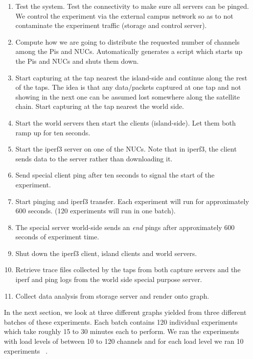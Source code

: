 \begin{enumerate}

\item Test the system. Test the connectivity to make sure all servers can be pinged. We control the experiment via the external campus network so as to not contaminate the experiment traffic (storage and control server). 
\item Compute how we are going to distribute the requested number of channels among the Pis and NUCs. Automatically generates a script which starts up the Pis and NUCs and shuts them down.
\item Start capturing at the tap nearest the island-side and continue along the rest of the taps. The idea is that any data/packets captured at one tap and not showing in the next one can be assumed lost somewhere along the satellite chain. Start capturing at the tap nearest the world side. 
\item Start the world servers then start the clients (island-side). Let them both ramp up for ten seconds.
\item Start the iperf3 server on one of the NUCs. Note that in iperf3, the client sends data to the server rather than downloading it.
\item Send special client ping after ten seconds to signal the start of the experiment.
\item Start pinging and iperf3 transfer. Each experiment will run for approximately 600 seconds. (120 experiments will run in one batch).
\item  The special server world-side sends an \emph{end} pings after approximately 600 seconds of experiment time.
\item Shut down the iperf3 client, island clients and world servers.
\item Retrieve trace files collected by the taps from both capture servers and the iperf and ping logs from the world side special purpose server.
\item Collect data analysis from storage server and render onto graph.\\
\end{enumerate}

In the next section, we look at three different graphs yielded from three different batches of these experiments. Each batch contains 120 individual experiments which take roughly 15 to 30 minutes each to perform. We ran the experiments with load levels of between 10 to 120 channels and for each load level we ran 10 experiments ~\cite{21}. \\

